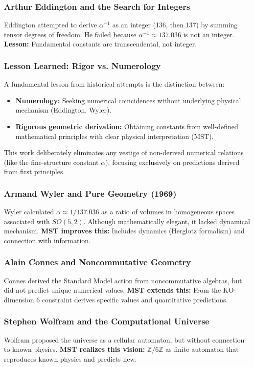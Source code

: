 \documentclass[11pt, a4paper]{article}
\theoremstyle{plain}
\theoremstyle{definition}
\newcommand{\Zmod}{\mathbb{Z}/6\mathbb{Z}}
\begin{document}
\subsubsection{Arthur Eddington and the Search for Integers}
Eddington attempted to derive $\alpha^{-1}$ as an integer (136, then 137) by summing tensor degrees of freedom. He failed because $\alpha^{-1} \approx 137.036$ is not an integer. \textbf{Lesson:} Fundamental constants are transcendental, not integer.

\subsubsection{Lesson Learned: Rigor vs. Numerology}
A fundamental lesson from historical attempts is the distinction between:
\begin{itemize}
    \item \textbf{Numerology:} Seeking numerical coincidences without underlying physical mechanism (Eddington, Wyler).
    \item \textbf{Rigorous geometric derivation:} Obtaining constants from well-defined mathematical principles with clear physical interpretation (MST).
\end{itemize}
This work deliberately eliminates any vestige of non-derived numerical relations (like the fine-structure constant $\alpha$), focusing exclusively on predictions derived from first principles.

\subsubsection{Armand Wyler and Pure Geometry (1969)}
Wyler calculated $\alpha \approx 1/137.036$ as a ratio of volumes in homogeneous spaces associated with $SO(5,2)$. Although mathematically elegant, it lacked dynamical mechanism. \textbf{MST improves this:} Includes dynamics (Herglotz formalism) and connection with information.

\subsubsection{Alain Connes and Noncommutative Geometry}
Connes derived the Standard Model action from noncommutative algebras, but did not predict unique numerical values. \textbf{MST extends this:} From the KO-dimension 6 constraint derives specific values and quantitative predictions.

\subsubsection{Stephen Wolfram and the Computational Universe}
Wolfram proposed the universe as a cellular automaton, but without connection to known physics. \textbf{MST realizes this vision:} $\Zmod$ as finite automaton that reproduces known physics and predicts new.
\end{document}
